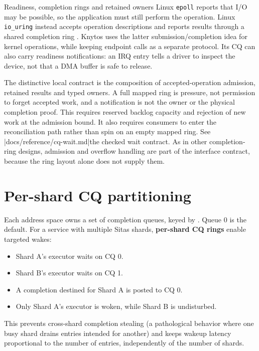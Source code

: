\begin{architecturalcomparison}{Readiness, completion rings and retained owners}
Linux \texttt{epoll} reports that I/O may be possible, so the application must
still perform the operation. Linux \texttt{io\_uring} instead accepts operation
descriptions and reports results through a shared completion ring
\cite{prior:epoll,prior:io-uring}. Knytos uses the latter
submission/completion idea for kernel operations, while keeping endpoint
calls as a separate protocol. Its CQ can also carry readiness notifications:
an IRQ entry tells a driver to inspect the device, not that a DMA buffer is
safe to release.

The distinctive local contract is the composition of accepted-operation
admission, retained results and typed owners. A full mapped ring is pressure,
not permission to forget accepted work, and a notification is not the owner or
the physical completion proof. This requires reserved backlog capacity and
rejection of new work at the admission bound. It also requires consumers to
enter the reconciliation path rather than spin on an empty mapped ring.
See \repofiletext|docs/reference/cq-wait.md|{the checked wait contract}.
As in other completion-ring designs, admission and overflow handling are part
of the interface contract, because the ring layout alone does not supply them.
\end{architecturalcomparison}

\section{Per-shard CQ partitioning}

Each address space owns a set of completion queues, keyed by . Queue
0 is the default. For a service with multiple Sitas shards, \textbf{per-shard CQ
rings} enable targeted wakes:

\begin{itemize}
    \item Shard A's executor waits on CQ 0.
    \item Shard B's executor waits on CQ 1.
    \item A completion destined for Shard A is posted to CQ 0.
    \item Only Shard A's executor is woken, while Shard B is undisturbed.
\end{itemize}

This prevents cross-shard completion stealing (a pathological behavior where one
busy shard drains entries intended for another) and keeps wakeup latency
proportional to the number of entries, independently of the number of shards.

